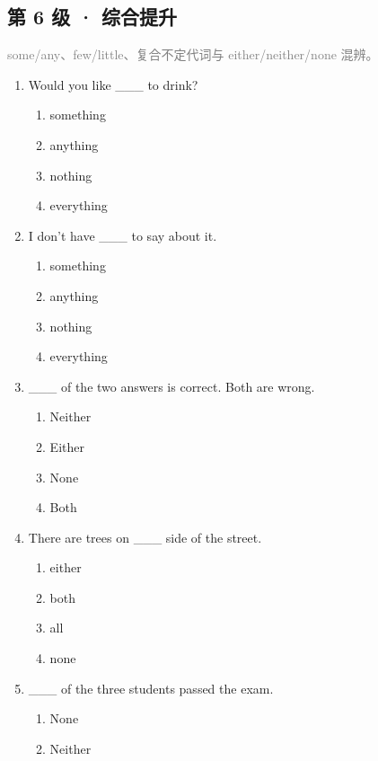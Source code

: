\documentclass[11pt,a4paper]{ctexart}
\begin{document}
\subsection*{第 6 级 · 综合提升}
\noindent\textcolor{gray}{some/any、few/little、复合不定代词与 either/neither/none 混辨。}\par\smallskip
\begin{enumerate}[leftmargin=*,itemsep=4pt]
\item Would you like \_\_\_ to drink?
\begin{enumerate}[label=\Alph*.,leftmargin=2em,itemsep=1pt,topsep=2pt]
\item something
\item anything
\item nothing
\item everything
\end{enumerate}
\item I don’t have \_\_\_ to say about it.
\begin{enumerate}[label=\Alph*.,leftmargin=2em,itemsep=1pt,topsep=2pt]
\item something
\item anything
\item nothing
\item everything
\end{enumerate}
\item \_\_\_ of the two answers is correct. Both are wrong.
\begin{enumerate}[label=\Alph*.,leftmargin=2em,itemsep=1pt,topsep=2pt]
\item Neither
\item Either
\item None
\item Both
\end{enumerate}
\item There are trees on \_\_\_ side of the street.
\begin{enumerate}[label=\Alph*.,leftmargin=2em,itemsep=1pt,topsep=2pt]
\item either
\item both
\item all
\item none
\end{enumerate}
\item \_\_\_ of the three students passed the exam.
\begin{enumerate}[label=\Alph*.,leftmargin=2em,itemsep=1pt,topsep=2pt]
\item None
\item Neither

\end{enumerate}
\end{enumerate}
\end{document}
